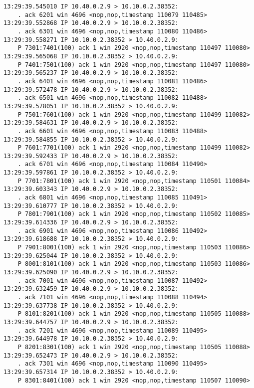 \documentclass[a4paper,12pt]{article}
\begin{document}
\begin{Verbatim}
13:29:39.545010 IP 10.40.0.2.9 > 10.10.0.2.38352: 
    . ack 6201 win 4696 <nop,nop,timestamp 110079 110485>
13:29:39.552868 IP 10.40.0.2.9 > 10.10.0.2.38352: 
    . ack 6301 win 4696 <nop,nop,timestamp 110080 110486>
13:29:39.558271 IP 10.10.0.2.38352 > 10.40.0.2.9: 
    P 7301:7401(100) ack 1 win 2920 <nop,nop,timestamp 110497 110080>
13:29:39.565068 IP 10.10.0.2.38352 > 10.40.0.2.9: 
    P 7401:7501(100) ack 1 win 2920 <nop,nop,timestamp 110497 110080>
13:29:39.565237 IP 10.40.0.2.9 > 10.10.0.2.38352: 
    . ack 6401 win 4696 <nop,nop,timestamp 110081 110486>
13:29:39.572478 IP 10.40.0.2.9 > 10.10.0.2.38352: 
    . ack 6501 win 4696 <nop,nop,timestamp 110082 110488>
13:29:39.578051 IP 10.10.0.2.38352 > 10.40.0.2.9: 
    P 7501:7601(100) ack 1 win 2920 <nop,nop,timestamp 110499 110082>
13:29:39.584631 IP 10.40.0.2.9 > 10.10.0.2.38352: 
    . ack 6601 win 4696 <nop,nop,timestamp 110083 110488>
13:29:39.584855 IP 10.10.0.2.38352 > 10.40.0.2.9: 
    P 7601:7701(100) ack 1 win 2920 <nop,nop,timestamp 110499 110082>
13:29:39.592433 IP 10.40.0.2.9 > 10.10.0.2.38352: 
    . ack 6701 win 4696 <nop,nop,timestamp 110084 110490>
13:29:39.597861 IP 10.10.0.2.38352 > 10.40.0.2.9: 
    P 7701:7801(100) ack 1 win 2920 <nop,nop,timestamp 110501 110084>
13:29:39.603343 IP 10.40.0.2.9 > 10.10.0.2.38352: 
    . ack 6801 win 4696 <nop,nop,timestamp 110085 110491>
13:29:39.610777 IP 10.10.0.2.38352 > 10.40.0.2.9: 
    P 7801:7901(100) ack 1 win 2920 <nop,nop,timestamp 110502 110085>
13:29:39.614336 IP 10.40.0.2.9 > 10.10.0.2.38352: 
    . ack 6901 win 4696 <nop,nop,timestamp 110086 110492>
13:29:39.618688 IP 10.10.0.2.38352 > 10.40.0.2.9: 
    P 7901:8001(100) ack 1 win 2920 <nop,nop,timestamp 110503 110086>
13:29:39.625044 IP 10.10.0.2.38352 > 10.40.0.2.9: 
    P 8001:8101(100) ack 1 win 2920 <nop,nop,timestamp 110503 110086>
13:29:39.625090 IP 10.40.0.2.9 > 10.10.0.2.38352: 
    . ack 7001 win 4696 <nop,nop,timestamp 110087 110492>
13:29:39.632459 IP 10.40.0.2.9 > 10.10.0.2.38352: 
    . ack 7101 win 4696 <nop,nop,timestamp 110088 110494>
13:29:39.637738 IP 10.10.0.2.38352 > 10.40.0.2.9: 
    P 8101:8201(100) ack 1 win 2920 <nop,nop,timestamp 110505 110088>
13:29:39.644757 IP 10.40.0.2.9 > 10.10.0.2.38352: 
    . ack 7201 win 4696 <nop,nop,timestamp 110089 110495>
13:29:39.644978 IP 10.10.0.2.38352 > 10.40.0.2.9: 
    P 8201:8301(100) ack 1 win 2920 <nop,nop,timestamp 110505 110088>
13:29:39.652473 IP 10.40.0.2.9 > 10.10.0.2.38352: 
    . ack 7301 win 4696 <nop,nop,timestamp 110090 110495>
13:29:39.657314 IP 10.10.0.2.38352 > 10.40.0.2.9: 
    P 8301:8401(100) ack 1 win 2920 <nop,nop,timestamp 110507 110090>

\end{Verbatim}
\end{document}
